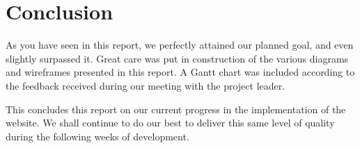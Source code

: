 \section{Conclusion}

As you have seen in this report, we perfectly attained our planned goal, and
even slightly surpassed it. Great care was put in construction of the
various diagrams and wireframes presented in this report. A Gantt chart was
included according to the feedback received during our meeting with the project leader. \newline

This concludes this report on our current progress in the implementation of
the website. We shall continue to do our best to deliver this same level of quality
during the following weeks of development.
